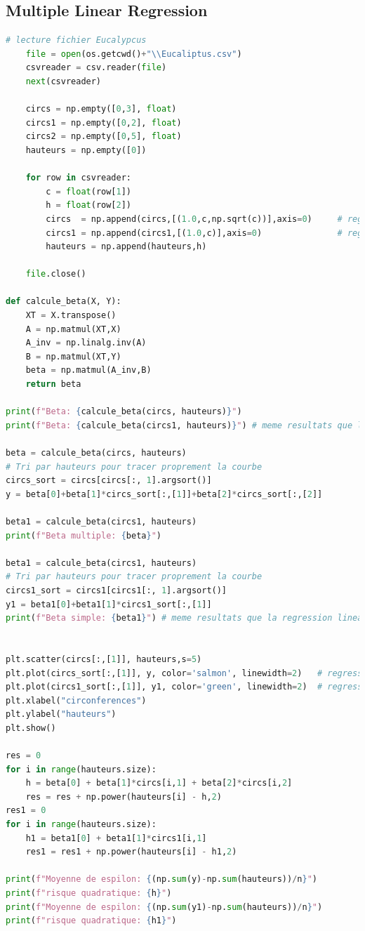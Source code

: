 \documentclass[
	12pt, %
]{article}
\theoremstyle{definition}
\begin{document}
\subsection{Multiple Linear Regression}

\begin{lstlisting}[language=Python]
    # lecture fichier Eucalypcus
    file = open(os.getcwd()+"\\Eucaliptus.csv")
    csvreader = csv.reader(file)
    next(csvreader)
    
    circs = np.empty([0,3], float)
    circs1 = np.empty([0,2], float)
    circs2 = np.empty([0,5], float)
    hauteurs = np.empty([0])
    
    for row in csvreader:
        c = float(row[1])
        h = float(row[2])
        circs  = np.append(circs,[(1.0,c,np.sqrt(c))],axis=0)     # regression multiple ordre 2
        circs1 = np.append(circs1,[(1.0,c)],axis=0)               # regression simple
        hauteurs = np.append(hauteurs,h)
    
    file.close()

def calcule_beta(X, Y):
    XT = X.transpose()
    A = np.matmul(XT,X)
    A_inv = np.linalg.inv(A)
    B = np.matmul(XT,Y)
    beta = np.matmul(A_inv,B)
    return beta

print(f"Beta: {calcule_beta(circs, hauteurs)}")
print(f"Beta: {calcule_beta(circs1, hauteurs)}") # meme resultats que la regression lineaire simple 

beta = calcule_beta(circs, hauteurs)
# Tri par hauteurs pour tracer proprement la courbe
circs_sort = circs[circs[:, 1].argsort()]
y = beta[0]+beta[1]*circs_sort[:,[1]]+beta[2]*circs_sort[:,[2]]

beta1 = calcule_beta(circs1, hauteurs)
print(f"Beta multiple: {beta}")

beta1 = calcule_beta(circs1, hauteurs)
# Tri par hauteurs pour tracer proprement la courbe
circs1_sort = circs1[circs1[:, 1].argsort()]
y1 = beta1[0]+beta1[1]*circs1_sort[:,[1]]
print(f"Beta simple: {beta1}") # meme resultats que la regression lineaire simple 


plt.scatter(circs[:,[1]], hauteurs,s=5)
plt.plot(circs_sort[:,[1]], y, color='salmon', linewidth=2)   # regression lineaire multiple
plt.plot(circs1_sort[:,[1]], y1, color='green', linewidth=2)  # regression lineaire simple
plt.xlabel("circonferences")
plt.ylabel("hauteurs")
plt.show()

res = 0
for i in range(hauteurs.size):
    h = beta[0] + beta[1]*circs[i,1] + beta[2]*circs[i,2]
    res = res + np.power(hauteurs[i] - h,2) 
res1 = 0
for i in range(hauteurs.size):
    h1 = beta1[0] + beta1[1]*circs1[i,1]
    res1 = res1 + np.power(hauteurs[i] - h1,2) 

print(f"Moyenne de espilon: {(np.sum(y)-np.sum(hauteurs))/n}")
print(f"risque quadratique: {h}")
print(f"Moyenne de espilon: {(np.sum(y1)-np.sum(hauteurs))/n}")
print(f"risque quadratique: {h1}")

\end{lstlisting}
\end{document}
